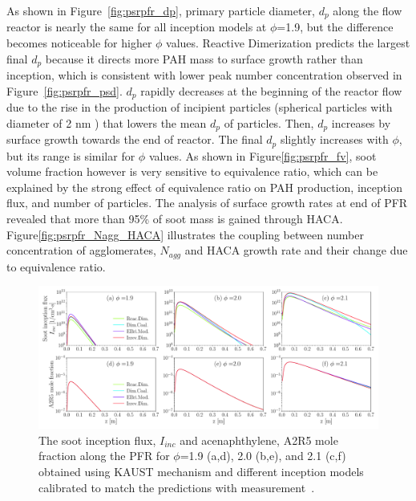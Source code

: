As shown in Figure~\ref{fig:psrpfr_dp}, primary particle diameter, $d_p$ along the flow reactor is nearly the same for all inception models at $\phi$=1.9, but the difference becomes noticeable for higher $\phi$ values. Reactive Dimerization predicts the largest final $d_p$ because it directs more PAH mass to surface growth rather than inception, which is consistent with lower peak number concentration observed in Figure~\ref{fig:psrpfr_psd}. $d_p$ rapidly decreases at the beginning of the reactor flow due to the rise in the production of incipient particles (spherical particles with diameter of 2 nm ) that lowers the mean $d_p$ of particles. Then, $d_p$ increases by surface growth towards the end of reactor. The final $d_p$ slightly increases with $\phi$, but its range is similar for $\phi$ values. As shown in Figure\ref{fig:psrpfr_fv}, soot volume fraction however is very sensitive to equivalence ratio, which can be explained by the strong effect of equivalence ratio on PAH production, inception flux, and number of particles. The analysis of surface growth rates at end of PFR revealed that more than 95\% of soot mass is gained through HACA. Figure\ref{fig:psrpfr_Nagg_HACA} illustrates the coupling between number concentration of agglomerates, $N_{agg}$ and HACA growth rate and their change due to equivalence ratio.  


\begin{figure}[H]
	\centering
	\includegraphics[width=1\textwidth]{Figures/Results/PSR/I_inc_PAH_eq_ratio_all_single_mech.pdf}
	\caption{The soot inception flux, $I_{inc}$ and acenaphthylene, A2R5 mole fraction along the PFR for $\phi$=1.9 (a,d), 2.0 (b,e), and 2.1 (c,f) obtained using KAUST mechanism and different inception models calibrated to match the predictions with measurement~\citep{manzello2007soot}.}
	\label{fig:psrpfr_Iinc_PAH} 
\end{figure}

